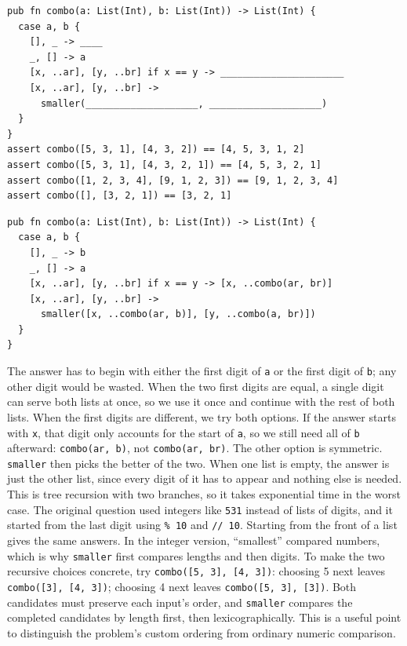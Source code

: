 \begin{blocksection}
\begin{lstlisting}
pub fn combo(a: List(Int), b: List(Int)) -> List(Int) {
  case a, b {
    [], _ -> ____
    _, [] -> a
    [x, ..ar], [y, ..br] if x == y -> ______________________
    [x, ..ar], [y, ..br] ->
      smaller(____________________, ____________________)
  }
}
assert combo([5, 3, 1], [4, 3, 2]) == [4, 5, 3, 1, 2]
assert combo([5, 3, 1], [4, 3, 2, 1]) == [4, 5, 3, 2, 1]
assert combo([1, 2, 3, 4], [9, 1, 2, 3]) == [9, 1, 2, 3, 4]
assert combo([], [3, 2, 1]) == [3, 2, 1]
\end{lstlisting}
\begin{solution}
\begin{lstlisting}
pub fn combo(a: List(Int), b: List(Int)) -> List(Int) {
  case a, b {
    [], _ -> b
    _, [] -> a
    [x, ..ar], [y, ..br] if x == y -> [x, ..combo(ar, br)]
    [x, ..ar], [y, ..br] ->
      smaller([x, ..combo(ar, b)], [y, ..combo(a, br)])
  }
}
\end{lstlisting}
\end{solution}
\begin{questionmeta}
  The answer has to begin with either the first digit of \texttt{a} or the first digit of \texttt{b}; any other digit would be wasted. When the two first digits are equal, a single digit can serve both lists at once, so we use it once and continue with the rest of both lists.
  When the first digits are different, we try both options. If the answer starts with \texttt{x}, that digit only accounts for the start of \texttt{a}, so we still need all of \texttt{b} afterward: \lstinline{combo(ar, b)}, not \lstinline{combo(ar, br)}. The other option is symmetric. \texttt{smaller} then picks the better of the two.
  When one list is empty, the answer is just the other list, since every digit of it has to appear and nothing else is needed.
  This is tree recursion with two branches, so it takes exponential time in the worst case.
  The original question used integers like \texttt{531} instead of lists of digits, and it started from the last digit using \lstinline|% 10| and \lstinline|// 10|. Starting from the front of a list gives the same answers. In the integer version, ``smallest'' compared numbers, which is why \texttt{smaller} first compares lengths and then digits.
  To make the two recursive choices concrete, try \lstinline{combo([5, 3], [4, 3])}: choosing 5 next leaves \lstinline{combo([3], [4, 3])}; choosing 4 next leaves \lstinline{combo([5, 3], [3])}. Both candidates must preserve each input's order, and \texttt{smaller} compares the completed candidates by length first, then lexicographically. This is a useful point to distinguish the problem's custom ordering from ordinary numeric comparison.
\end{questionmeta}
\end{blocksection}
